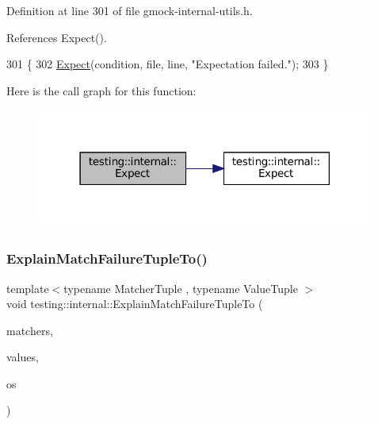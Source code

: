 Definition at line 301 of file gmock-\/internal-\/utils.\+h.



References Expect().


\begin{DoxyCode}
301                                                                \{
302   \hyperlink{namespacetesting_1_1internal_a0dfe8a755bd02aa5ea162764b61a9d97}{Expect}(condition, file, line, \textcolor{stringliteral}{"Expectation failed."});
303 \}
\end{DoxyCode}
Here is the call graph for this function\+:
\nopagebreak
\begin{figure}[H]
\begin{center}
\leavevmode
\includegraphics[width=316pt]{namespacetesting_1_1internal_a0dfe8a755bd02aa5ea162764b61a9d97_cgraph}
\end{center}
\end{figure}
\mbox{\label{namespacetesting_1_1internal_afd62fd8914a7fae1bfc8a314fcc81f22}} 
\subsubsection{\texorpdfstring{Explain\+Match\+Failure\+Tuple\+To()}{ExplainMatchFailureTupleTo()}}
{\footnotesize\ttfamily template$<$typename Matcher\+Tuple , typename Value\+Tuple $>$ \\
void testing\+::internal\+::\+Explain\+Match\+Failure\+Tuple\+To (\begin{DoxyParamCaption}\item[{const \hyperlink{structtesting_1_1internal_1_1MatcherTuple}{Matcher\+Tuple} \&}]{matchers,  }\item[{const Value\+Tuple \&}]{values,  }\item[{\+::std\+::ostream $\ast$}]{os }\end{DoxyParamCaption})}



